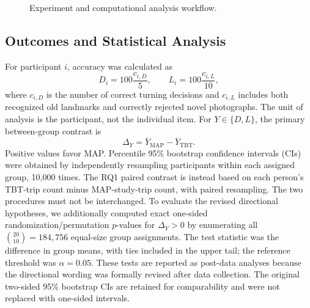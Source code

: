 \begin{figure}[t]
\centering
{}
\caption{Experiment and computational analysis workflow.}\label{fig:pipeline}
\end{figure}

\subsection{Outcomes and Statistical Analysis}
For participant $i$, accuracy was calculated as
\begin{equation}\label{eq:accuracy}
D_i=100\frac{c_{i,D}}{5},\qquad L_i=100\frac{c_{i,L}}{10},
\end{equation}
where $c_{i,D}$ is the number of correct turning decisions and $c_{i,L}$ includes both recognized old landmarks and correctly rejected novel photographs. The unit of analysis is the participant, not the individual item. For $Y\in\{D,L\}$, the primary between-group contrast is
\begin{equation}\label{eq:delta}
\Delta_Y=\overline{Y}_{\mathrm{MAP}}-\overline{Y}_{\mathrm{TBT}}.
\end{equation}
Positive values favor MAP. Percentile 95\% bootstrap confidence intervals (CIs) were obtained by independently resampling participants within each assigned group, 10,000 times. The RQ1 paired contrast is instead based on each person's TBT-trip count minus MAP-study-trip count, with paired resampling. The two procedures must not be interchanged. To evaluate the revised directional hypotheses, we additionally computed exact one-sided randomization/permutation $p$-values for $\Delta_Y>0$ by enumerating all $\binom{20}{10}=184{,}756$ equal-size group assignments. The test statistic was the difference in group means, with ties included in the upper tail; the reference threshold was $\alpha=0.05$. These tests are reported as post-data analyses because the directional wording was formally revised after data collection. The original two-sided 95\% bootstrap CIs are retained for comparability and were not replaced with one-sided intervals.

